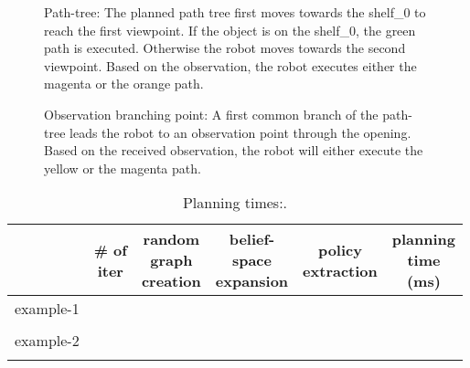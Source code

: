 \documentclass[letterpaper, 10 pt, conference]{ieeeconf}  %
\begin{document}
\begin{figure}[!htb]
 \caption{Path-tree: The planned path tree first moves towards the shelf\_0 to reach the first viewpoint. If the object is on the shelf\_0, the green path is executed. Otherwise the robot moves towards the second viewpoint. Based on the observation, the robot executes either the magenta or the orange path.}
 \label{fig:example_1_path_tree}
\end{figure}

\begin{figure}[!htb]
 \caption{Observation branching point: A first common branch of the path-tree leads the robot to an observation point through the opening. Based on the received observation, the robot will either execute the yellow or the magenta path.}
 \label{fig:example_2_view_point}
\end{figure}






\begin{table}[h]
\begin{center}
\begin{tabular}{|c||c|c|c|c||c|}
\hline
  & \thead{\# of\\ iter} & \thead{random\\graph\\creation} & \thead{belief-\\space\\expansion} & \thead{policy\\ extraction} & \thead{planning\\time\\(ms)} \\
\hline
example-1  & & & & &\\
 & & & & &\\
\hline
example-2  & & & & &\\
 & & & & &\\
\hline
\end{tabular}
\end{center}
\caption{Planning times:.}
\label{tab:table_obstacle_avoidance}
\end{table}
\end{document}
